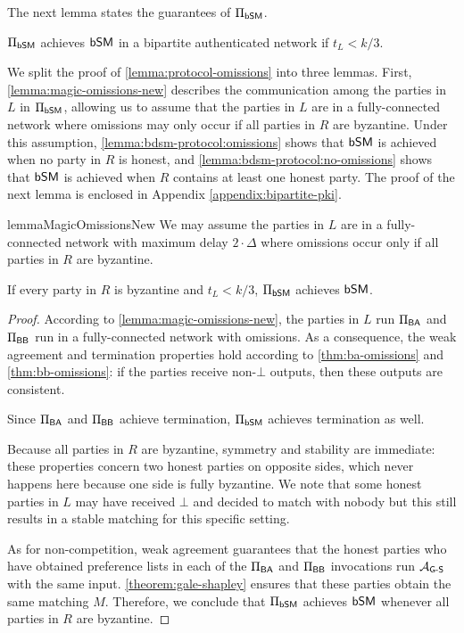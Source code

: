 The next lemma states the guarantees of $\Pi_{\textsf{bSM}}$.
\begin{lemma}\label{lemma:protocol-omissions}
    $\Pi_{\textsf{bSM}}$ achieves $\textsf{bSM}$ in a  bipartite authenticated network if $t_L < k/3$.
\end{lemma}


We split the proof of \cref{lemma:protocol-omissions} into three lemmas. First, \cref{lemma:magic-omissions-new} describes the communication among the parties in $L$ in $\Pi_{\textsf{bSM}}$, allowing us to assume that the parties in $L$ are in a fully-connected network where omissions may only occur if all parties in $R$ are byzantine. Under this assumption, \cref{lemma:bdsm-protocol:omissions} shows that $\textsf{bSM}$ is achieved when no party in $R$ is honest, and \cref{lemma:bdsm-protocol:no-omissions} shows that $\textsf{bSM}$ is achieved when $R$ contains at least one honest party.
The proof of the next lemma is enclosed in Appendix  \ref{appendix:bipartite-pki}.
\begin{restatable}{lemma}{MagicOmissionsNew}\label{lemma:magic-omissions-new}
We may assume the parties in $L$ are in a fully-connected network with maximum delay $2 \cdot \Delta$  where omissions occur only if all parties in $R$ are byzantine.
\end{restatable}


\begin{lemma}\label{lemma:bdsm-protocol:omissions}
    If every party in $R$ is byzantine and $t_L < k / 3$, $\Pi_{\textsf{bSM}}$ achieves $\textsf{bSM}$.
\end{lemma}
\begin{proof}
According to \cref{lemma:magic-omissions-new}, the parties in $L$ run $\Pi_{\textsf{BA}}$ and $\Pi_{\textsf{BB}}$ run in a fully-connected network with omissions. As a consequence, the weak agreement and termination properties hold according to \cref{thm:ba-omissions} and \cref{thm:bb-omissions}: if the parties receive non-$\bot$ outputs, then these outputs are consistent.

Since $\Pi_{\textsf{BA}}$ and $\Pi_{\textsf{BB}}$ achieve termination, $\Pi_{\textsf{bSM}}$ achieves termination as well.

Because all parties in $R$ are byzantine, symmetry and stability are immediate: these properties concern two honest parties on opposite sides, which never happens here because one side is fully byzantine. We note that some honest parties in $L$ may have received $\bot$ and decided to match with nobody but this still results in a stable matching for this specific setting.

As for non-competition, weak agreement guarantees that the honest parties who have obtained preference lists in each of the $\Pi_{\textsf{BA}}$ and $\Pi_{\textsf{BB}}$ invocations run $\mathcal{A}_\textsf{G-S}$ with the same input. \cref{theorem:gale-shapley} ensures that these parties obtain the same matching $M$. Therefore, we conclude that $\Pi_{\textsf{bSM}}$ achieves $\textsf{bSM}$ whenever all parties in $R$ are byzantine. 
\end{proof}

